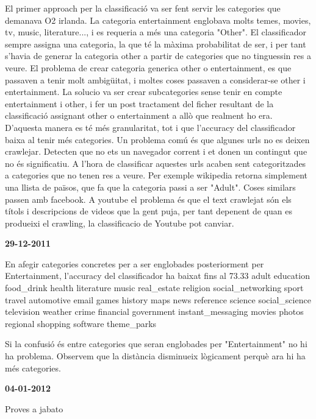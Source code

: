 El primer approach per la classificació va ser fent servir les categories que demanava O2 irlanda. La categoria entertainment englobava molts temes, movies, tv, music,
literature..., i es requeria a més una categoria "Other". El classificador sempre assigna una categoria, la que té la màxima probabilitat de ser, i per tant s'havia 
de generar la categoria other a partir de categories que no tinguessin res a veure.
El problema de crear categoria generica other o entertainment, es que passaven a tenir molt ambigüitat, i moltes coses passaven a considerar-se other i entertainment.
La solucio va ser crear subcategories sense tenir en compte entertainment i other, i fer un post tractament del ficher resultant de la classificació assignant other o 
entertainment a allò que realment ho era. D'aquesta manera es té més granularitat, tot i que l'accuracy del classificador baixa al tenir més categories.
Un problema comú és que algunes urls no es deixen crawlejar. Detecten que no ets un navegador corrent i et donen un contingut que no és significatiu. A l'hora de
classificar aquestes urls acaben sent categoritzades a categories que no tenen res a veure. Per exemple wikipedia retorna simplement una llista de països, que fa que 
la categoria passi a ser "Adult". Coses similars passen amb facebook. 
A youtube el problema és que el text crawlejat són els títols i descripcions de videos que la gent puja, per tant depenent de quan es produeixi el crawling, la
classificacio de Youtube pot canviar.


\textbf{29-12-2011}

  En afegir categories concretes per a ser englobades posteriorment per Entertainment, l'accuracy del classificador ha baixat fins al 73.33
  adult       education  food\_drink  health             literature  music   real\_estate  religion  social\_networking  sport        travel
  automotive  email      games       history            maps        news    reference    science   social\_science     television   weather
  crime       financial  government  instant\_messaging  movies      photos  regional     shopping  software           theme\_parks

  Si la confusió és entre categories que seran englobades per "Entertainment" no hi ha problema. 
  Observem que la distància disminueix lògicament perquè ara hi ha més categories.

\textbf{04-01-2012}
 
  Proves a jabato
